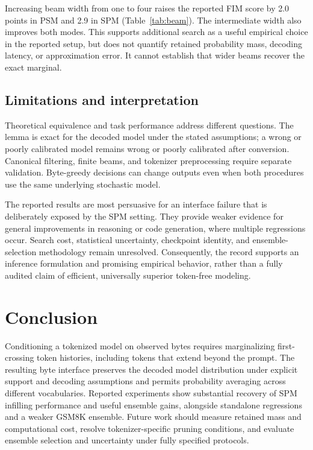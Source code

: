 \documentclass{article}
\begin{document}
Increasing beam width from one to four raises the reported FIM score by 2.0 points in PSM and 2.9 in SPM (Table~\ref{tab:beam}). The intermediate width also improves both modes. This supports additional search as a useful empirical choice in the reported setup, but does not quantify retained probability mass, decoding latency, or approximation error. It cannot establish that wider beams recover the exact marginal.

\subsection{Limitations and interpretation}
\label{sec:limitations}
Theoretical equivalence and task performance address different questions. The lemma is exact for the decoded model under the stated assumptions; a wrong or poorly calibrated model remains wrong or poorly calibrated after conversion. Canonical filtering, finite beams, and tokenizer preprocessing require separate validation. Byte-greedy decisions can change outputs even when both procedures use the same underlying stochastic model.

The reported results are most persuasive for an interface failure that is deliberately exposed by the SPM setting. They provide weaker evidence for general improvements in reasoning or code generation, where multiple regressions occur. Search cost, statistical uncertainty, checkpoint identity, and ensemble-selection methodology remain unresolved. Consequently, the record supports an inference formulation and promising empirical behavior, rather than a fully audited claim of efficient, universally superior token-free modeling.

\section{Conclusion}
\label{sec:conclusion}
Conditioning a tokenized model on observed bytes requires marginalizing first-crossing token histories, including tokens that extend beyond the prompt. The resulting byte interface preserves the decoded model distribution under explicit support and decoding assumptions and permits probability averaging across different vocabularies. Reported experiments show substantial recovery of SPM infilling performance and useful ensemble gains, alongside standalone regressions and a weaker GSM8K ensemble. Future work should measure retained mass and computational cost, resolve tokenizer-specific pruning conditions, and evaluate ensemble selection and uncertainty under fully specified protocols.
\end{document}
